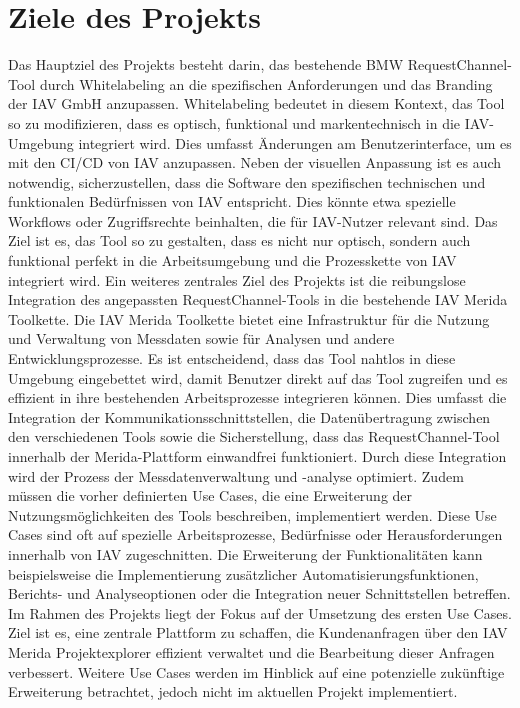 \section{Ziele des Projekts}
Das Hauptziel des Projekts besteht darin, das bestehende BMW RequestChannel-Tool durch Whitelabeling an die spezifischen Anforderungen und das Branding der IAV GmbH anzupassen. Whitelabeling bedeutet in diesem Kontext, das Tool so zu modifizieren, dass es optisch, funktional und markentechnisch in die IAV-Umgebung integriert wird. Dies umfasst Änderungen am Benutzerinterface, um es mit den \ac{CI/CD} von IAV anzupassen. Neben der visuellen Anpassung ist es auch notwendig, sicherzustellen, dass die Software den spezifischen technischen und funktionalen Bedürfnissen von IAV entspricht. Dies könnte etwa spezielle Workflows oder Zugriffsrechte beinhalten, die für IAV-Nutzer relevant sind. Das Ziel ist es, das Tool so zu gestalten, dass es nicht nur optisch, sondern auch funktional perfekt in die Arbeitsumgebung und die Prozesskette von IAV integriert wird.
\newline
\newline
Ein weiteres zentrales Ziel des Projekts ist die reibungslose Integration des angepassten RequestChannel-Tools in die bestehende IAV Merida Toolkette. Die IAV Merida Toolkette bietet eine Infrastruktur für die Nutzung und Verwaltung von Messdaten sowie für Analysen und andere Entwicklungsprozesse. Es ist entscheidend, dass das Tool nahtlos in diese Umgebung eingebettet wird, damit Benutzer direkt auf das Tool zugreifen und es effizient in ihre bestehenden Arbeitsprozesse integrieren können. Dies umfasst die Integration der Kommunikationsschnittstellen, die Datenübertragung zwischen den verschiedenen Tools sowie die Sicherstellung, dass das RequestChannel-Tool innerhalb der Merida-Plattform einwandfrei funktioniert. Durch diese Integration wird der Prozess der Messdatenverwaltung und -analyse optimiert.
\newline
\newline
Zudem müssen die vorher definierten Use Cases, die eine Erweiterung der Nutzungsmöglichkeiten des Tools beschreiben, implementiert werden. Diese Use Cases sind oft auf spezielle Arbeitsprozesse, Bedürfnisse oder Herausforderungen innerhalb von IAV zugeschnitten. Die Erweiterung der Funktionalitäten kann beispielsweise die Implementierung zusätzlicher Automatisierungsfunktionen, Berichts- und Analyseoptionen oder die Integration neuer Schnittstellen betreffen. 
\newline
Im Rahmen des Projekts liegt der Fokus auf der Umsetzung des ersten Use Cases. Ziel ist es, eine zentrale Plattform zu schaffen, die Kundenanfragen über den IAV Merida Projektexplorer effizient verwaltet und die Bearbeitung dieser Anfragen verbessert. Weitere Use Cases werden im Hinblick auf eine potenzielle zukünftige Erweiterung betrachtet, jedoch nicht im aktuellen Projekt implementiert.

